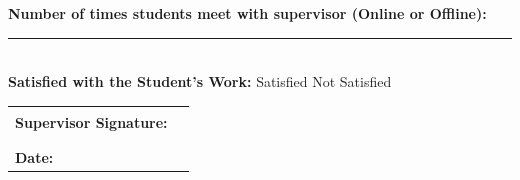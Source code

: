 \documentclass[12pt,a4paper]{article}
\begin{document}
\noindent\textbf{Number of times students meet with supervisor (Online or Offline):} \rule{1cm}{0.4pt} \\

\noindent\textbf{Satisfied with the Student's Work:} 
\hspace{0.5cm} Satisfied 
\hspace{1cm} Not Satisfied

\vspace{0.5cm}

\vspace{1.5cm}

\noindent\begin{tabular}{p{7cm} p{6cm}}
\textbf{Supervisor Signature:} & \rule{5cm}{0.4pt} \\
\\
\textbf{Date:} 
\end{tabular}

\vspace{0.8cm}
\end{document}
